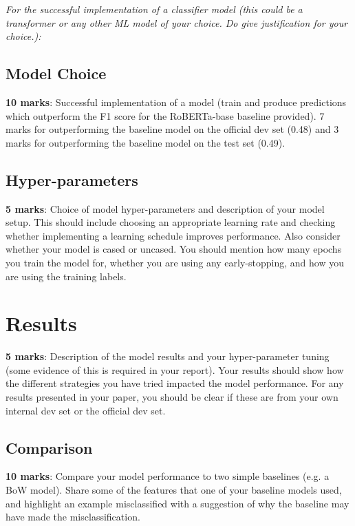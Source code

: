 \documentclass[11pt,a4paper]{article}
\begin{document}
\emph{For the successful implementation of a classifier model (this could be a transformer or any other ML model of your choice. Do give justification for your choice.):}

\subsection{Model Choice}

\textbf{10 marks}: Successful implementation of a model (train and produce predictions which outperform the F1 score for the RoBERTa-base baseline provided). 7 marks for outperforming the baseline model on the official dev set (0.48) and 3 marks for outperforming the baseline model on the test set (0.49).

\subsection{Hyper-parameters}

\textbf{5 marks}: Choice of model hyper-parameters and description of your model setup. This should include choosing an appropriate learning rate and checking whether implementing a learning schedule improves performance. Also consider whether your model is cased or uncased. You should mention how many epochs you train the model for, whether you are using any early-stopping, and how you are using the training labels.

\section{Results}

\textbf{5 marks}: Description of the model results and your hyper-parameter tuning (some evidence of this is required in your report). Your results should show how the different strategies you have tried impacted the model performance. For any results presented in your paper, you should be clear if these are from your own internal dev set or the official dev set.

\subsection{Comparison}

\textbf{10 marks}: Compare your model performance to two simple baselines (e.g. a BoW model). Share some of the features that one of your baseline models used, and highlight an example misclassified with a suggestion of why the baseline may have made the misclassification.
\end{document}
